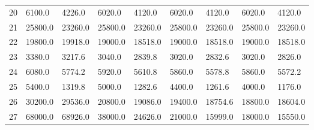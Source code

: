 \begin{tabular}{|r|l|l|l|l|l|l|l|l|}
  20 & 6100.0 & 4226.0 & 6020.0 & 4120.0 & 6020.0 & 4120.0 & 6020.0 & 4120.0 \\ 
  21 & 25800.0 & 23260.0 & 25800.0 & 23260.0 & 25800.0 & 23260.0 & 25800.0 & 23260.0 \\ 
  22 & 19800.0 & 19918.0 & 19000.0 & 18518.0 & 19000.0 & 18518.0 & 19000.0 & 18518.0 \\ 
  23 & 3380.0 & 3217.6 & 3040.0 & 2839.8 & 3020.0 & 2832.6 & 3020.0 & 2826.0 \\ 
  24 & 6080.0 & 5774.2 & 5920.0 & 5610.8 & 5860.0 & 5578.8 & 5860.0 & 5572.2 \\ 
  25 & 5400.0 & 1319.8 & 5000.0 & 1282.6 & 4400.0 & 1261.6 & 4000.0 & 1176.0 \\ 
  26 & 30200.0 & 29536.0 & 20800.0 & 19086.0 & 19400.0 & 18754.6 & 18800.0 & 18604.0 \\ 
  27 & 68000.0 & 68926.0 & 38000.0 & 24626.0 & 21000.0 & 15999.0 & 18000.0 & 15550.0 \\ 
\end{tabular}
